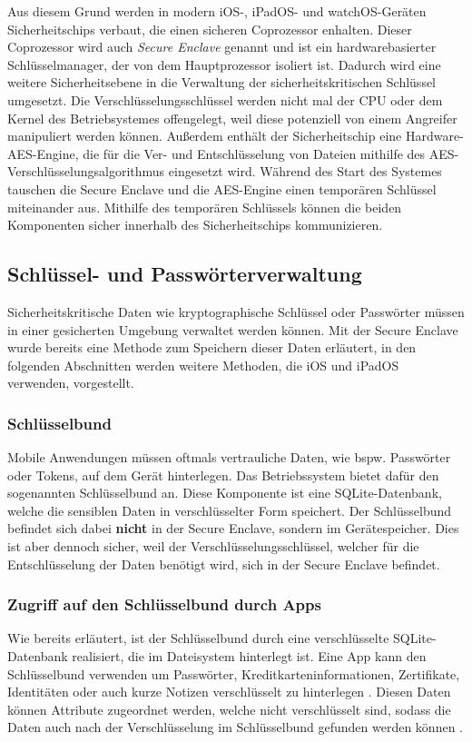 Aus diesem Grund werden in modern iOS-, iPadOS- und watchOS-Geräten Sicherheitschips verbaut, die einen sicheren
Coprozessor enhalten. Dieser Coprozessor wird auch \textit{Secure Enclave} genannt und ist ein hardwarebasierter 
Schlüsselmanager, der von dem Hauptprozessor isoliert ist. Dadurch wird eine weitere Sicherheitsebene in die 
Verwaltung der sicherheitskritischen Schlüssel umgesetzt. Die Verschlüsselungsschlüssel werden nicht mal
der CPU oder dem Kernel des Betriebsystemes offengelegt, weil diese potenziell von einem Angreifer manipuliert
werden können. Außerdem enthält der Sicherheitschip eine Hardware-AES-Engine, die für die Ver- und Entschlüsselung
von Dateien mithilfe des AES-Verschlüsselungsalgorithmus eingesetzt wird. Während des Start des Systemes tauschen
die Secure Enclave und die AES-Engine einen temporären Schlüssel miteinander aus. Mithilfe des temporären Schlüssels
können die beiden Komponenten sicher innerhalb des Sicherheitschips kommunizieren. \\

\subsection{Schlüssel- und Passwörterverwaltung}
Sicherheitskritische Daten wie kryptographische Schlüssel oder Passwörter müssen in einer gesicherten Umgebung
verwaltet werden können. Mit der Secure Enclave wurde bereits eine Methode zum Speichern dieser Daten erläutert, 
in den folgenden Abschnitten werden weitere Methoden, die iOS und iPadOS verwenden, vorgestellt.

\subsubsection{Schlüsselbund}
Mobile Anwendungen müssen oftmals vertrauliche Daten, wie bspw. Passwörter oder Tokens, auf dem Gerät hinterlegen. 
Das Betriebssystem bietet dafür den sogenannten Schlüsselbund an. Diese Komponente ist eine SQLite-Datenbank,
welche die sensiblen Daten in verschlüsselter Form speichert. Der Schlüsselbund befindet sich dabei \textbf{nicht} in der
Secure Enclave, sondern im Gerätespeicher. Dies ist aber dennoch sicher, weil der Verschlüsselungsschlüssel, welcher
für die Entschlüsselung der Daten benötigt wird, sich in der Secure Enclave befindet.

\subsubsection{Zugriff auf den Schlüsselbund durch Apps}
Wie bereits erläutert, ist der Schlüsselbund durch eine verschlüsselte SQLite-Datenbank realisiert, die im Dateisystem hinterlegt ist. Eine App kann den Schlüsselbund verwenden um Passwörter, Kreditkarteninformationen, Zertifikate, Identitäten oder auch kurze Notizen verschlüsselt zu hinterlegen \cite{apple2020keychain_services}.
Diesen Daten können Attribute zugeordnet werden, welche nicht verschlüsselt sind, sodass die Daten auch nach der Verschlüsselung im Schlüsselbund gefunden werden können \cite{apple2020keychain_items}. 

